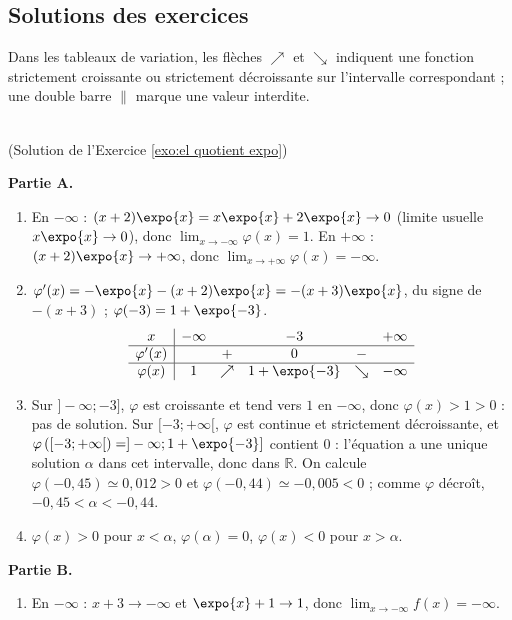 \begin{corrige}
\section{Solutions des exercices}
Dans les tableaux de variation, les fl\`eches $\nearrow$ et $\searrow$ indiquent une fonction strictement croissante ou
strictement d\'ecroissante sur l'intervalle correspondant ; une double barre $\|$ marque une valeur interdite.

\begin{sol} ~ \\
(Solution de l'Exercice \ref{exo:el quotient expo})

\textbf{Partie A.}
\begin{enumerate}
\item En $-\infty$ : $(x+2)\expo{x} = x\expo{x} + 2\expo{x} \to 0$ (limite usuelle $x \expo{x} \to 0$), donc $\lim_{x\to-\infty}\varphi(x) = 1$.
      En $+\infty$ : $(x+2)\expo{x} \to +\infty$, donc $\lim_{x\to+\infty}\varphi(x) = -\infty$.
\item $\varphi'(x) = -\expo{x} - (x+2)\expo{x} = -(x+3)\expo{x}$, du signe de $-(x+3)$ ; $\varphi(-3) = 1 + \expo{-3}$.
      \[
      \begin{array}{c|ccccc}
      x & -\infty & & -3 & & +\infty \\ \hline
      \varphi'(x) & & + & 0 & - & \\ \hline
      \varphi(x) & 1 & \nearrow & 1 + \expo{-3} & \searrow & -\infty
      \end{array}
      \]
\item Sur $]-\infty ; -3]$, $\varphi$ est croissante et tend vers $1$ en $-\infty$, donc $\varphi(x) > 1 > 0$ : pas de solution.
      Sur $[-3 ; +\infty[$, $\varphi$ est continue et strictement d\'ecroissante, et $\varphi\left([-3;+\infty[\right) = ]-\infty ; 1 + \expo{-3}]$
      contient $0$ : l'\'equation a une unique solution $\alpha$ dans cet intervalle, donc dans $\mathbb{R}$.
      On calcule $\varphi(-0{,}45) \simeq 0{,}012 > 0$ et $\varphi(-0{,}44) \simeq -0{,}005 < 0$ ; comme $\varphi$ d\'ecro\^it,
      $\boxed{-0{,}45 < \alpha < -0{,}44}$.
\item $\varphi(x) > 0$ pour $x < \alpha$, $\varphi(\alpha) = 0$, $\varphi(x) < 0$ pour $x > \alpha$.
\end{enumerate}
\textbf{Partie B.}
\begin{enumerate}
\item En $-\infty$ : $x + 3 \to -\infty$ et $\expo{x} + 1 \to 1$, donc $\lim_{x\to-\infty} f(x) = -\infty$.

\end{enumerate}
\end{sol}
\end{corrige}
